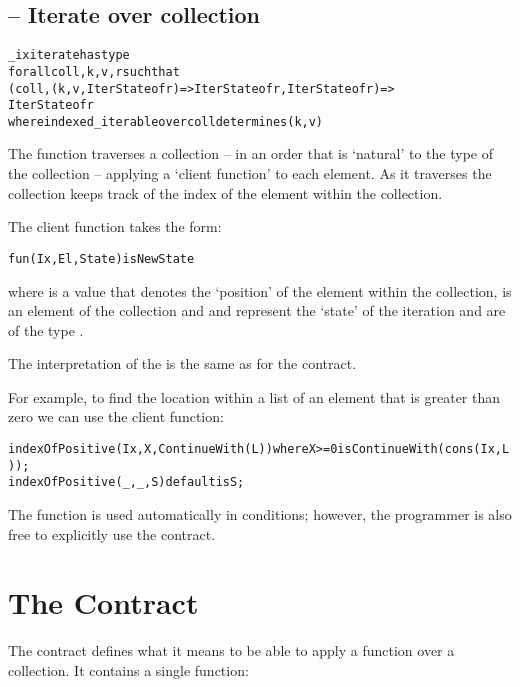 \subsection{ -- Iterate over collection}
\label{iterateFunction}
\begin{alltt}
_ixiterate has type 
    for all coll,k,v,r such that 
      (coll,(k,v,IterState of r)=>IterState of r,IterState of r) => 
        IterState of r
      where indexed\_iterable over coll determines (k,v)
\end{alltt}

The  function traverses a collection -- in an order that is `natural' to the type of the collection -- applying a `client function' to each element. As it traverses the collection  keeps track of the index of the element within the collection.

The client function takes the form:
\begin{alltt}
fun(Ix,El,State) is NewState
\end{alltt}
where  is a value that denotes the `position' of the element within the collection,  is an element of the collection and  and  represent the `state' of the iteration and are of the type .

The interpretation of the  is the same as for the  contract.

For example, to find the location within a  list of an element that is greater than zero we can use the client function:
\begin{alltt}
indexOfPositive(Ix,X, ContinueWith(L)) where X>=0 is ContinueWith(cons(Ix,L));
indexOfPositive(_,_,S) default is S;
\end{alltt}
\begin{aside}
The  function is used automatically in  conditions; however, the programmer is also free to explicitly use the  contract.
\end{aside}

\section{The  Contract}
\label{mappableContract}
The  contract defines what it means to be able to apply a function over a collection. It contains a single  function:

